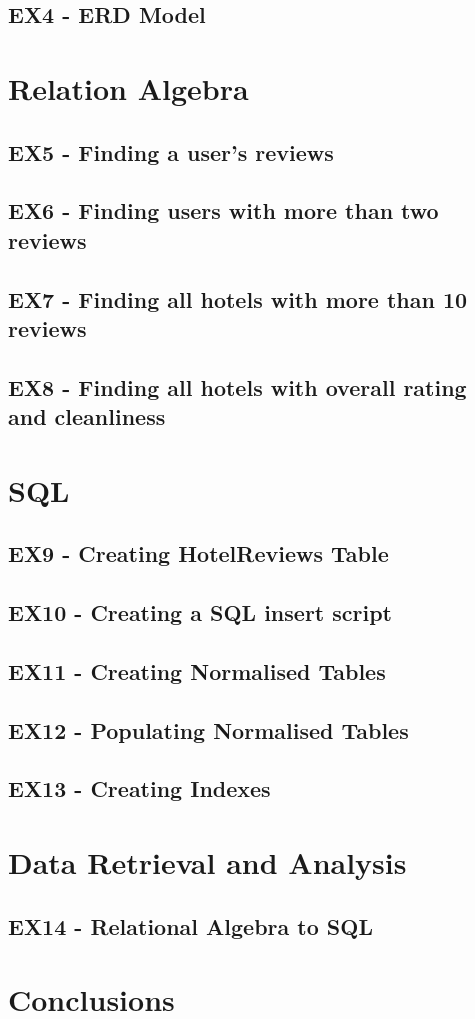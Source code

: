 \documentclass[a4paper]{article}
\begin{document}
\subsection{EX4 - ERD Model}

\section{Relation Algebra}
\subsection{EX5 - Finding a user's reviews}
\subsection{EX6 - Finding users with more than two reviews}
\subsection{EX7 - Finding all hotels with more than 10 reviews}
\subsection{EX8 - Finding all hotels with overall rating and cleanliness}

\section{SQL}
\subsection{EX9 - Creating HotelReviews Table}
\subsection{EX10 - Creating a SQL insert script}
\subsection{EX11 - Creating Normalised Tables}
\subsection{EX12 - Populating Normalised Tables}
\subsection{EX13 - Creating Indexes}

\section{Data Retrieval and Analysis}
\subsection{EX14 - Relational Algebra to SQL}

\section{Conclusions}
\end{document}
